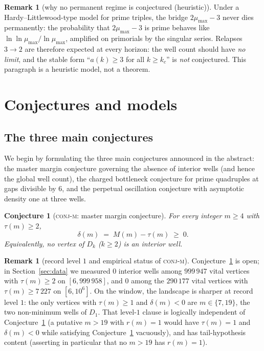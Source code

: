 \documentclass[11pt]{article}
\theoremstyle{plain}
\newtheorem{conjecture}[theorem]{Conjecture}
\theoremstyle{definition}
\newtheorem{remark}[theorem]{Remark}
\newcommand{\rch}{r}
\newcommand{\Dk}{D_{k}}
\begin{document}
\begin{remark}[why no permanent regime is conjectured (heuristic)]
\label{rem:hl3}
Under a Hardy--Littlewood-type model for prime triples, the bridge
$2\mu_{\max}-3$ never dies permanently: the probability that
$2\mu_{\max}-3$ is prime behaves like
$\ln\ln \mu_{\max} / \ln \mu_{\max}$, amplified on primorials by
the singular series. Relapses $3 \to 2$ are therefore expected at
every horizon: the well count should have \emph{no limit}, and the
stable form ``$a(k) \ge 3$ for all $k \ge k_c$'' is \emph{not}
conjectured. This paragraph is a heuristic model, not a theorem.
\end{remark}

\section{Conjectures and models}
\label{sec:conj}

\subsection{The three main conjectures}

We begin by formulating the three main conjectures announced in the
abstract: the master margin conjecture governing the absence of
interior wells (and hence the global well count), the charged
bottleneck conjecture for prime quadruples at gaps divisible by $6$,
and the perpetual oscillation conjecture with asymptotic density one
at three wells.

\begin{conjecture}[\textsc{conj-m}: master margin conjecture]
\label{conj:M}
For every integer $m \ge 4$ with $\tau(m) \ge 2$,
\[
\delta(m) \;=\; M(m) - \tau(m) \;\ge\; 0 .
\]
Equivalently, no vertex of $\Dk$ ($k \ge 2$) is an interior well.
\end{conjecture}

\begin{remark}[record level $1$ and empirical status of \textsc{conj-m}]
Conjecture~\ref{conj:M} is open; in Section~\ref{sec:data} we
measured $0$ interior wells among $999\,947$ vital vertices with
$\tau(m) \ge 2$ on $[6, 999\,958]$, and $0$ among the $290\,177$
vital vertices with $\tau(m) \ge 7\,227$ on $[6, 10^{6}]$. On the window,
the landscape is sharper at record level $1$: the only vertices
with $\tau(m) \ge 1$ and $\delta(m) < 0$ are $m \in \{7, 19\}$, the
two non-minimum wells of $D_1$. That level-$1$ clause is logically
independent of Conjecture~\ref{conj:M} (a putative $m > 19$ with
$\rch(m) = 1$ would have $\tau(m) = 1$ and $\delta(m) < 0$ while
satisfying Conjecture~\ref{conj:M} vacuously), and has
tail-hypothesis content (asserting in particular that no $m > 19$
has $\rch(m) = 1$).
\end{remark}
\end{document}
